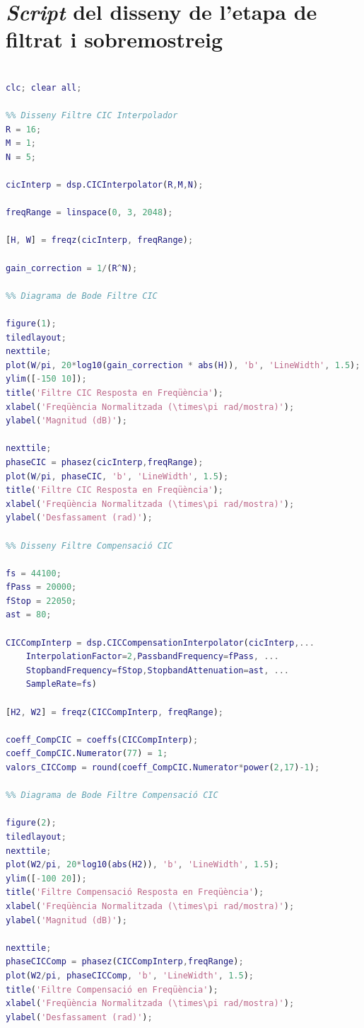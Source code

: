 \section{\textit{Script} del disseny de l'etapa de filtrat i sobremostreig}
\begin{lstlisting}[language=Matlab, basicstyle=\ttfamily\small, breaklines=true, frame=single]

clc; clear all;

%% Disseny Filtre CIC Interpolador
R = 16;          
M = 1;           
N = 5;          

cicInterp = dsp.CICInterpolator(R,M,N);

freqRange = linspace(0, 3, 2048);

[H, W] = freqz(cicInterp, freqRange);

gain_correction = 1/(R^N);

%% Diagrama de Bode Filtre CIC

figure(1);
tiledlayout;
nexttile;
plot(W/pi, 20*log10(gain_correction * abs(H)), 'b', 'LineWidth', 1.5);
ylim([-150 10]);
title('Filtre CIC Resposta en Freqüència');
xlabel('Freqüència Normalitzada (\times\pi rad/mostra)');
ylabel('Magnitud (dB)');

nexttile;
phaseCIC = phasez(cicInterp,freqRange);
plot(W/pi, phaseCIC, 'b', 'LineWidth', 1.5);
title('Filtre CIC Resposta en Freqüència');
xlabel('Freqüència Normalitzada (\times\pi rad/mostra)');
ylabel('Desfassament (rad)');

%% Disseny Filtre Compensació CIC

fs = 44100;
fPass = 20000;
fStop = 22050;
ast = 80;

CICCompInterp = dsp.CICCompensationInterpolator(cicInterp,...
    InterpolationFactor=2,PassbandFrequency=fPass, ...
    StopbandFrequency=fStop,StopbandAttenuation=ast, ...
    SampleRate=fs)

[H2, W2] = freqz(CICCompInterp, freqRange);

coeff_CompCIC = coeffs(CICCompInterp);
coeff_CompCIC.Numerator(77) = 1;
valors_CICComp = round(coeff_CompCIC.Numerator*power(2,17)-1);

%% Diagrama de Bode Filtre Compensació CIC

figure(2);
tiledlayout;
nexttile;
plot(W2/pi, 20*log10(abs(H2)), 'b', 'LineWidth', 1.5);
ylim([-100 20]);
title('Filtre Compensació Resposta en Freqüència');
xlabel('Freqüència Normalitzada (\times\pi rad/mostra)');
ylabel('Magnitud (dB)');

nexttile;
phaseCICComp = phasez(CICCompInterp,freqRange);
plot(W2/pi, phaseCICComp, 'b', 'LineWidth', 1.5);
title('Filtre Compensació en Freqüència');
xlabel('Freqüència Normalitzada (\times\pi rad/mostra)');
ylabel('Desfassament (rad)');


\end{lstlisting}

